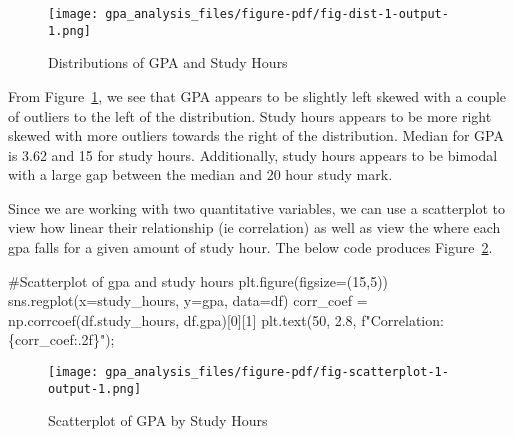 \documentclass[
  letterpaper,
  DIV=11,
  numbers=noendperiod]{scrreprt}
\newenvironment{Shaded}{\begin{snugshade}}{\end{snugshade}}
\newcommand{\CommentTok}[1]{\textcolor[rgb]{0.37,0.37,0.37}{#1}}
\newcommand{\DecValTok}[1]{\textcolor[rgb]{0.68,0.00,0.00}{#1}}
\newcommand{\FloatTok}[1]{\textcolor[rgb]{0.68,0.00,0.00}{#1}}
\newcommand{\NormalTok}[1]{\textcolor[rgb]{0.00,0.23,0.31}{#1}}
\newcommand{\OperatorTok}[1]{\textcolor[rgb]{0.37,0.37,0.37}{#1}}
\newcommand{\SpecialCharTok}[1]{\textcolor[rgb]{0.37,0.37,0.37}{#1}}
\newcommand{\SpecialStringTok}[1]{\textcolor[rgb]{0.13,0.47,0.30}{#1}}
\newcommand{\StringTok}[1]{\textcolor[rgb]{0.13,0.47,0.30}{#1}}
\begin{document}
\begin{figure}[H]

{\centering \texttt{[image: gpa\_analysis\_files/figure-pdf/fig-dist-1-output-1.png]}

}

\caption{\label{fig-dist-1}Distributions of GPA and Study Hours}

\end{figure}

From Figure~\ref{fig-dist-1}, we see that GPA appears to be slightly
left skewed with a couple of outliers to the left of the distribution.
Study hours appears to be more right skewed with more outliers towards
the right of the distribution. Median for GPA is 3.62 and 15 for study
hours. Additionally, study hours appears to be bimodal with a large gap
between the median and 20 hour study mark.

Since we are working with two quantitative variables, we can use a
scatterplot to view how linear their relationship (ie correlation) as
well as view the where each gpa falls for a given amount of study hour.
The below code produces Figure~\ref{fig-scatterplot-1}.

\begin{Shaded}
\begin{Highlighting}[]
\CommentTok{\#Scatterplot of gpa and study hours}
\NormalTok{plt.figure(figsize}\OperatorTok{=}\NormalTok{(}\DecValTok{15}\NormalTok{,}\DecValTok{5}\NormalTok{))}
\NormalTok{sns.regplot(x}\OperatorTok{=}\StringTok{\textquotesingle{}study\_hours\textquotesingle{}}\NormalTok{, y}\OperatorTok{=}\StringTok{\textquotesingle{}gpa\textquotesingle{}}\NormalTok{, data}\OperatorTok{=}\NormalTok{df)}
\NormalTok{corr\_coef }\OperatorTok{=}\NormalTok{ np.corrcoef(df.study\_hours, df.gpa)[}\DecValTok{0}\NormalTok{][}\DecValTok{1}\NormalTok{]}
\NormalTok{plt.text(}\DecValTok{50}\NormalTok{, }\FloatTok{2.8}\NormalTok{, }\SpecialStringTok{f"Correlation: }\SpecialCharTok{\{}\NormalTok{corr\_coef}\SpecialCharTok{:.2f\}}\SpecialStringTok{"}\NormalTok{)}\OperatorTok{;}
\end{Highlighting}
\end{Shaded}

\begin{figure}[H]

{\centering \texttt{[image: gpa\_analysis\_files/figure-pdf/fig-scatterplot-1-output-1.png]}

}

\caption{\label{fig-scatterplot-1}Scatterplot of GPA by Study Hours}

\end{figure}
\end{document}
